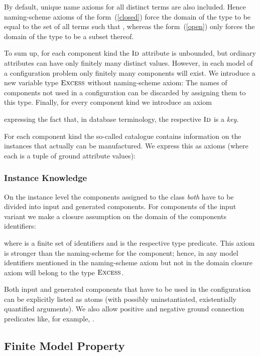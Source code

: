 \documentclass[copyright,creativecommons]{eptcs}
\newcommand{\sort}[1]{\ensuremath{\text{\sc #1}}\xspace}
\begin{document}
By default, unique name axioms for all distinct terms are also included. 
Hence naming-scheme axioms of the form~(\ref{closed}) force the domain of the type to be equal to the set of all terms  such that ,
whereas the form~(\ref{open}) only forces the domain of the type to be a subset thereof. 

To sum up, for each component kind the \sort{Id} attribute is unbounded, but ordinary attributes can have only finitely many distinct values.
However, in each model of a configuration problem only finitely many components will exist. We introduce a new variable type \sort{Excess} without naming-scheme axiom\/:
The names of components not used in a configuration can be discarded by assigning them to this type.
Finally, for every component kind we introduce an axiom



expressing the fact that, in database terminology, the respective \sort{Id} is a {\em key}.

For each component kind the so-called catalogue contains information on the instances that actually can be manufactured.
We express this as axioms (where each  is a tuple of ground attribute values)\/:



\subsubsection{Instance Knowledge}
On the instance level the components assigned to the class {\em both} have to be divided into input and generated components.
For components  of the input variant we make a closure assumption on the domain of the components identifiers\/:



where  is a finite set of identifiers  and  is the respective type predicate.
This axiom is stronger than the naming-scheme for the component;
hence, in any model identifiers mentioned in the naming-scheme axiom but not in the domain closure axiom will belong to the type \sort{Excess}.

Both input and generated components that have to be used in the configuration can be explicitly listed as atoms (with possibly uninstantiated, existentially quantified arguments).
We also allow positive and negative ground connection predicates like, for example, .

\subsection{Finite Model Property}
\end{document}
